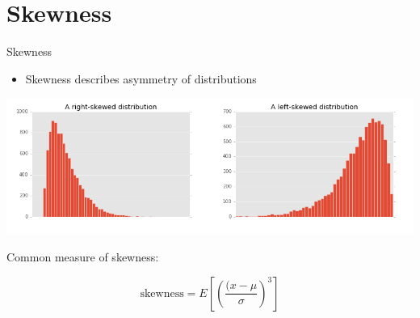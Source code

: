 \documentclass[presentation]{beamer}
\begin{document}
\section{Skewness}
\label{sec:orgheadline26}
\begin{frame}[label={sec:orgheadline25}]{Skewness}
\begin{itemize}
\item Skewness describes asymmetry of distributions
\end{itemize}

\includegraphics[width=.9\linewidth]{skewed-distributions.png}

Common measure of skewness:

\[
\mbox{skewness} = E\left[\left(\frac{(x - \mu}{\sigma}\right)^3\right]
\]
\end{frame}
\end{document}
